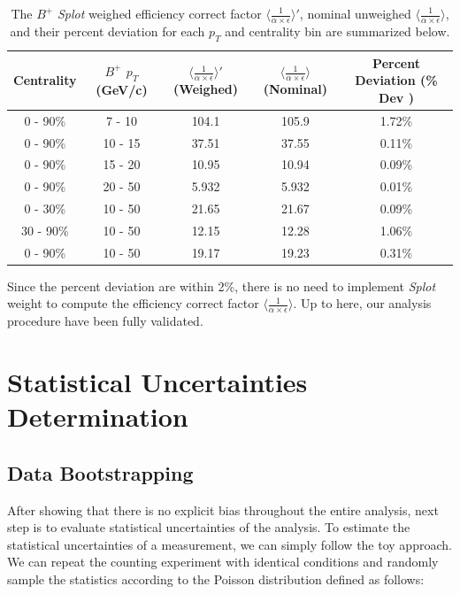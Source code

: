 \begin{table}[h]
\begin{center}
\caption{The $B^+$ \textit{Splot} weighed efficiency correct factor $\langle \frac{1}{\alpha \times \epsilon}\rangle'$, nominal unweighed $\langle \frac{1}{\alpha \times \epsilon} \rangle$, and their percent deviation for each $p_T$ and centrality bin are summarized below.}
\vspace{1em}
\label{BPSplotTable}
  \begin{tabular}{| c | c |c |c | c|}
    \hline
     Centrality &   $B^+$  $p_T$ (GeV/c) & $\langle \frac{1}{\alpha \times \epsilon} \rangle'$ (Weighed) & $\langle \frac{1}{\alpha \times \epsilon} \rangle$ (Nominal)  & Percent Deviation (\% Dev ) \\
    \hline
    \hline
0 - 90\% & 7 - 10   &  104.1  & 105.9 & 1.72\% \\ 
0 - 90\% & 10 - 15 &   37.51 & 37.55  & 0.11\%  \\ 
0 - 90\% & 15 - 20 &  10.95  &  10.94 & 0.09\% \\ 
0 - 90\% & 20 - 50 &   5.932 & 5.932 & 0.01\%  \\ 
0 - 30\% & 10 - 50 &  21.65  &21.67 & 0.09\%  \\ 
30 - 90\% & 10 - 50 &  12.15 &12.28 & 1.06\% \\ 
0 - 90\% & 10 - 50 &   19.17  & 19.23 &  0.31\% \\ 
    \hline
    \hline
\end{tabular}
\end{center}
\end{table}




Since the percent deviation are within 2\%, there is no need to implement \textit{Splot} weight to compute the  efficiency correct factor $\langle \frac{1}{\alpha \times \epsilon}\rangle$. Up to here, our analysis procedure have been fully validated. 

\section{Statistical Uncertainties Determination} 




\subsection{Data Bootstrapping}


After showing that there is no explicit bias throughout the entire analysis, next step is to evaluate statistical uncertainties of the analysis. To estimate the statistical uncertainties of a measurement, we can simply follow the toy approach. We can repeat the counting experiment with identical conditions and randomly sample the statistics according to the Poisson distribution defined as follows:

